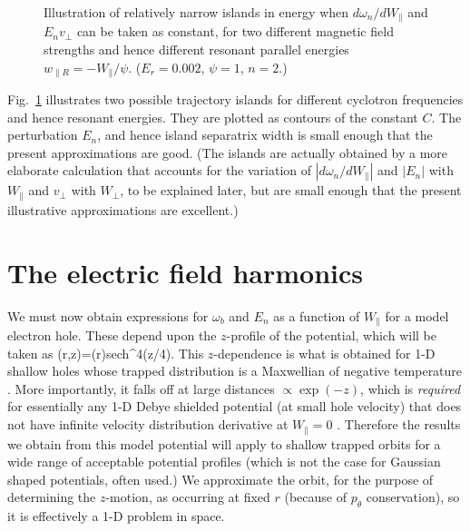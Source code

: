 \documentclass[draft,jgrga]{agutex}
\let\oldequation\equation
\let\oldendequation\endequation
\renewenvironment{equation}
  {\linenomathNonumbers\oldequation}
  {\oldendequation\endlinenomath}
\def\wr{w_{\parallel R}}
\begin{document}
\begin{article}
\begin{figure}[htbp]
  \caption{Illustration of relatively narrow islands in energy when
    $d\omega_n/dW_\parallel$ and $E_nv_\perp$ can be taken as
    constant, for two different magnetic field strengths and hence
    different resonant parallel energies
    $\wr=-W_\parallel/\psi$. ($E_r=0.002$, $\psi=1$, $n=2$.)}
  \label{fig:islands}
\end{figure}
Fig.\
\ref{fig:islands} illustrates two possible trajectory islands for
different cyclotron frequencies and hence resonant energies. They are
plotted as contours of the constant $C$.  The perturbation $E_n$, and
hence island separatrix width is small enough that the present
approximations are good. (The islands are actually obtained by a more
elaborate calculation that accounts for the variation of
$|d\omega_n/dW_\parallel|$ and $|E_n|$ with $W_\parallel$ and
$v_\perp$ with $W_\perp$, to be explained later, but are small enough
that the present illustrative approximations are excellent.)

\section{The electric field harmonics}

We must now obtain expressions for $\omega_b$ and $E_n$ as a function
of $W_\parallel$ for a model electron hole. These depend upon the
$z$-profile of the potential, which will be taken as
\begin{equation}
  \label{eq:phiofz}
  \phi(r,z)=\psi(r){\rm sech}^4(z/4).
\end{equation}
This $z$-dependence is what is obtained for 1-D shallow holes whose
trapped distribution is a Maxwellian of negative
temperature \citep{Schamel1979}. More importantly, it falls off at
large distances $\propto \exp(-z)$, which is \emph{required} for
essentially any 1-D Debye shielded potential (at small hole velocity)
that does not have infinite velocity distribution derivative at
$W_\parallel=0$ \citep{Hutchinson2017}. Therefore the results we obtain from this model
potential will apply to shallow trapped orbits for a wide range of
acceptable potential profiles (which is not the case for Gaussian
shaped potentials, often used.)  We approximate the orbit, for the
purpose of determining the $z$-motion, as occurring at fixed $r$
(because of $p_\theta$ conservation), so it is effectively a 1-D
problem in space.


\end{article}
\end{document}

